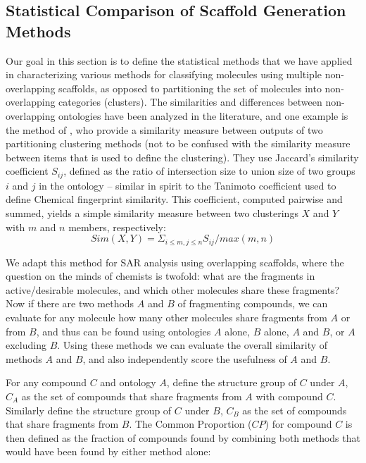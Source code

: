 \documentclass[journal=jacsat,manuscript=article]{achemso}
\begin{document}
\subsection{Statistical Comparison of Scaffold Generation Methods}
\label{sec:statmethod}
Our goal in this section is to define the statistical methods that we
have applied in characterizing various methods for classifying
molecules using multiple non-overlapping scaffolds, as opposed to
partitioning the set of molecules into non-overlapping categories
(clusters). The similarities and differences between non-overlapping
ontologies have been analyzed in the literature, and one example is
the method of \citeauthor{Torres2009}, who provide a similarity
measure between outputs of two partitioning clustering methods (not to
be confused with the similarity measure between items that is used to
define the clustering). They use Jaccard's similarity coefficient
$S_{ij}$, defined as the ratio of intersection size to union size of
two groups $i$ and $j$ in the ontology -- similar in spirit to the
Tanimoto coefficient used to define Chemical fingerprint similarity.
This coefficient, computed pairwise and summed, yields a simple
similarity measure between two clusterings $X$ and $Y$ with $m$ and
$n$ members, respectively:
\begin{equation}
Sim(X,Y) = \Sigma_{i \le m, j \le n}{S_{ij} / max(m,n)}
\end{equation}

We adapt this method for SAR analysis using overlapping scaffolds, where the question on the minds of chemists is twofold: what are the fragments in active/desirable molecules, and which other molecules share these fragments? Now if there are two methods $A$ and $B$ of fragmenting compounds, we can evaluate for any molecule how many other molecules share fragments from $A$ or from $B$, and thus can be found using ontologies $A$ alone, $B$ alone, $A$ and $B$, or $A$ excluding $B$.  Using these methods we can evaluate the overall similarity of methods $A$ and $B$, and also independently score the usefulness of $A$ and $B$.

For any compound $C$ and ontology $A$, define the structure group of $C$ under $A$, $C_A$ as the set of compounds that share fragments from $A$ with compound $C$. Similarly define the structure group of $C$ under $B$, $C_B$ as the set of compounds that share fragments from $B$. The Common Proportion ($CP$) for compound $C$ is then defined as the fraction of compounds found by combining both methods that would have been found by either method alone:
\end{document}
